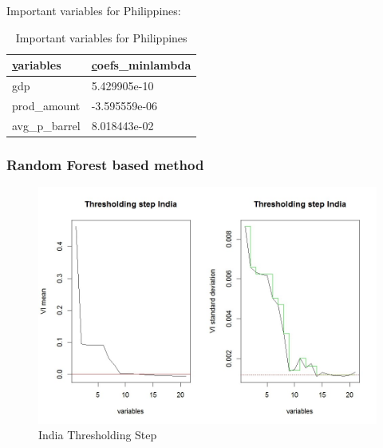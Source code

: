 \documentclass[11pt]{article}
\begin{document}
Important variables for Philippines:

\FloatBarrier
\begin{table}[!htbp]
\centering
\begin{tabular}{ll}
\hline
{\ul variables} & {\ul coefs\_minlambda} \\ \hline
gdp             & 5.429905e-10           \\
prod\_amount    & -3.595559e-06          \\
avg\_p\_barrel  & 8.018443e-02          \\ \hline
\end{tabular}
\caption{Important variables for Philippines}
\label{table21}
\end{table}
\FloatBarrier

\newpage
\subsubsection{Random Forest based method}

\FloatBarrier
\begin{figure}[!htb]
\begin{center}
\includegraphics[scale=0.55]{F1.jpg}
\caption{India Thresholding Step}
\label{figure12}
\end{center}
\end{figure}
\FloatBarrier
\end{document}
